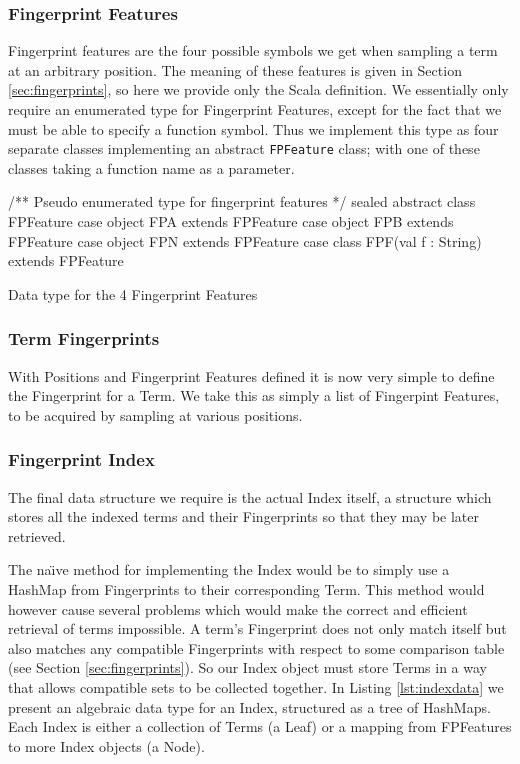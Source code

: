 \subsubsection{Fingerprint Features}

Fingerprint features are the four possible symbols we get when sampling a term
at an arbitrary position. The meaning of these features is given in Section \ref{sec:fingerprints},
so here we provide only the Scala definition. We essentially only require an
enumerated type for Fingerprint Features, except for the fact that we must be able
to specify a function symbol. Thus we implement this type as four separate classes
implementing an abstract \verb!FPFeature! class; with one of these classes taking
a function name as a parameter.

\begin{listing}[H]
\begin{scalacode}
/** Pseudo enumerated type for fingerprint features */
sealed abstract class FPFeature
case object FPA extends FPFeature 
case object FPB extends FPFeature
case object FPN extends FPFeature
case class  FPF(val f : String) extends FPFeature
\end{scalacode}
\caption{Data type for the 4 Fingerprint Features \protect\cite[p5]{shulz12}}
\label{lst:featuredata}
\end{listing}

\subsubsection{Term Fingerprints}

With Positions and Fingerprint Features defined it is now very simple
to define the Fingerprint for a Term. We take this as simply a list
of Fingerpint Features, to be acquired by sampling at various positions. 

\subsubsection{Fingerprint Index}

The final data structure we require is the actual Index itself, a structure
which stores all the indexed terms and their Fingerprints so that they may be later
retrieved.

The na\"{\i}ve method for implementing the Index would be to simply use a HashMap
from Fingerprints to their corresponding Term. This method would however cause
several problems which would make the correct and efficient retrieval of terms impossible.
A term's Fingerprint does not only match itself but also matches any compatible
Fingerprints with respect to some comparison table (see Section \ref{sec:fingerprints}).
So our Index object must store Terms in a way that allows compatible sets to be
collected together. In Listing \ref{lst:indexdata} we present an algebraic data
type for an Index, structured as a tree of HashMaps. Each Index is either a
collection of Terms (a Leaf) or a mapping from FPFeatures to more Index objects (a Node).

